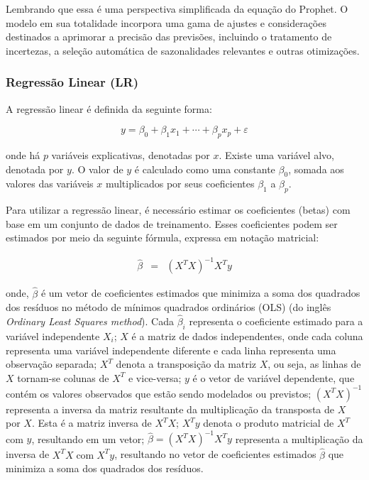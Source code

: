 Lembrando que essa é uma perspectiva simplificada da equação do Prophet. O modelo em sua totalidade incorpora uma gama de ajustes e considerações destinados a aprimorar a precisão das previsões, incluindo o tratamento de incertezas, a seleção automática de sazonalidades relevantes e outras otimizações. 





\subsubsection{Regress\~ao Linear (LR)}

A regressão linear é definida da seguinte forma:

\begin{equation}
	y = \beta_0 + \beta_1 x_1 + \cdots + \beta_p x_p + \varepsilon \label{eq:lr}
\end{equation}

\noindent onde há $p$ variáveis explicativas, denotadas por $x$. Existe uma variável alvo, denotada por $y$. O valor de $y$ é calculado como uma constante $\beta_0$, somada aos valores das variáveis $x$ multiplicados por seus coeficientes $\beta_1$ a $\beta_p$.


Para utilizar a regressão linear, é necessário estimar os coeficientes (betas) com base em um conjunto de dados de treinamento. Esses coeficientes podem ser estimados por meio da seguinte fórmula, expressa em notação matricial:

\begin{eqnarray}
	\hat{\beta}&=&\left(X^T X\right)^{-1} X^T y\label{eq:ols}
\end{eqnarray}

\noindent onde, $\hat{\beta}$ é um vetor de coeficientes estimados que minimiza a soma dos quadrados dos resíduos no método de mínimos quadrados ordinários (OLS) (do inglês \textit{Ordinary Least Squares method}). Cada $\hat{\beta}_i$ representa o coeficiente estimado para a variável independente $X_i$;
$X$ é a matriz de dados independentes, onde cada coluna representa uma variável independente diferente e cada linha representa uma observação separada;
$X^T$ denota a transposição da matriz $X$, ou seja, as linhas de $X$ tornam-se colunas de $X^T$ e vice-versa;
$y$ é o vetor de variável dependente, que contém os valores observados que estão sendo modelados ou previstos;
$\left(X^T X\right)^{-1}$ representa a inversa da matriz resultante da multiplicação da transposta de $X$ por $X$. Esta é a matriz inversa de $X^T X$;
$X^T y$ denota o produto matricial de $X^T$ com $y$, resultando em um vetor;
$\hat{\beta}=\left(X^T X\right)^{-1} X^T y$ representa a multiplicação da inversa de $X^T X \operatorname{com} X^T y$, resultando no vetor de coeficientes estimados $\hat{\beta}$ que minimiza a soma dos quadrados dos resíduos.

